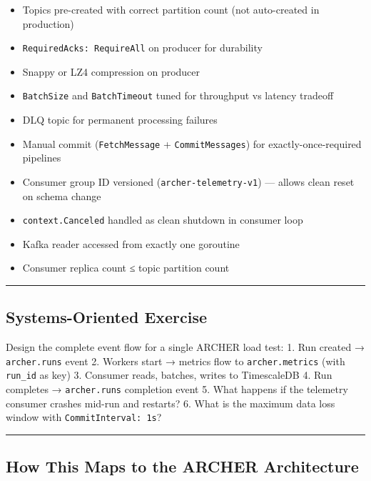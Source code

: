 \documentclass[
]{article}
\providecommand{\tightlist}{%
  \setlength{\itemsep}{0pt}\setlength{\parskip}{0pt}}
\begin{document}
\begin{itemize}
\tightlist
\item[$\square$]
  Topics pre-created with correct partition count (not auto-created in
  production)
\item[$\square$]
  \texttt{RequiredAcks:\ RequireAll} on producer for durability
\item[$\square$]
  Snappy or LZ4 compression on producer
\item[$\square$]
  \texttt{BatchSize} and \texttt{BatchTimeout} tuned for throughput vs
  latency tradeoff
\item[$\square$]
  DLQ topic for permanent processing failures
\item[$\square$]
  Manual commit (\texttt{FetchMessage} + \texttt{CommitMessages}) for
  exactly-once-required pipelines
\item[$\square$]
  Consumer group ID versioned (\texttt{archer-telemetry-v1}) --- allows
  clean reset on schema change
\item[$\square$]
  \texttt{context.Canceled} handled as clean shutdown in consumer loop
\item[$\square$]
  Kafka reader accessed from exactly one goroutine
\item[$\square$]
  Consumer replica count ≤ topic partition count
\end{itemize}

\begin{center}\rule{0.5\linewidth}{0.5pt}\end{center}

\hypertarget{systems-oriented-exercise-1}{%
\subsection{Systems-Oriented
Exercise}\label{systems-oriented-exercise-1}}

Design the complete event flow for a single ARCHER load test: 1. Run
created → \texttt{archer.runs} event 2. Workers start → metrics flow to
\texttt{archer.metrics} (with \texttt{run\_id} as key) 3. Consumer
reads, batches, writes to TimescaleDB 4. Run completes →
\texttt{archer.runs} completion event 5. What happens if the telemetry
consumer crashes mid-run and restarts? 6. What is the maximum data loss
window with \texttt{CommitInterval:\ 1s}?

\begin{center}\rule{0.5\linewidth}{0.5pt}\end{center}

\hypertarget{how-this-maps-to-the-archer-architecture-2}{%
\subsection{How This Maps to the ARCHER
Architecture}\label{how-this-maps-to-the-archer-architecture-2}}
\end{document}

